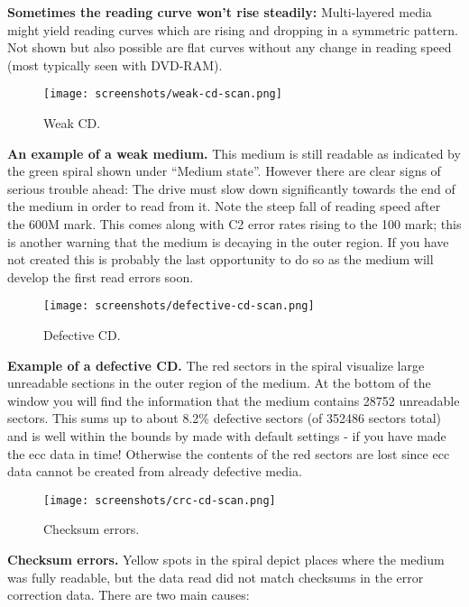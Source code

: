 {\bf Sometimes the reading curve won't rise steadily:} Multi-layered
media might yield reading curves which are rising and dropping
in a symmetric pattern. Not shown but also possible are flat
curves without any change in reading speed (most typically seen
with DVD-RAM).

\newpage
\begin{figure}[h]
\centerline{\texttt{[image: screenshots/weak-cd-scan.png]}}
\caption{Weak CD.}  
\label{howto-scan-weak-cd}
\end{figure}

{\bf An example of a weak medium.} This medium is still
readable as indicated by the green spiral shown under ``Medium state''.
However there are clear signs of serious trouble ahead: The drive must
slow down significantly towards the end of the medium in order to read
from it. Note the steep fall of reading speed after the 600M mark.
This comes along with C2 error rates rising to the 100 mark; this is
another warning that the medium is decaying in the outer region.
If you have not created  this is probably the
last opportunity to do so as the medium will develop the first
read errors soon.

\newpage
\begin{figure}[h]
\centerline{\texttt{[image: screenshots/defective-cd-scan.png]}}
\caption{Defective CD.}  
\label{howto-scan-defective-cd}
\end{figure}

{\bf Example of a defective CD.} \label{howto-interpret-defective-cd}
The red sectors in the spiral
visualize large unreadable sections in the outer region of the medium.
At the bottom of the window you will find the information that the
medium contains 28752 unreadable sectors. This sums up to about
8.2\% defective sectors (of 352486 sectors total) and is well within
the  bounds
by  made with default
settings - if you have made the ecc data in time! Otherwise the
contents of the red sectors are lost since ecc data cannot be
created from already defective media.

\newpage
\begin{figure}[h]
\centerline{\texttt{[image: screenshots/crc-cd-scan.png]}}
\caption{Checksum errors.}  
\label{howto-scan-checksum-errors}
\end{figure}

{\bf Checksum errors.} Yellow spots in the spiral depict places
where the medium was fully readable, but the data read did not
match checksums in the error correction data. There are two main causes:

